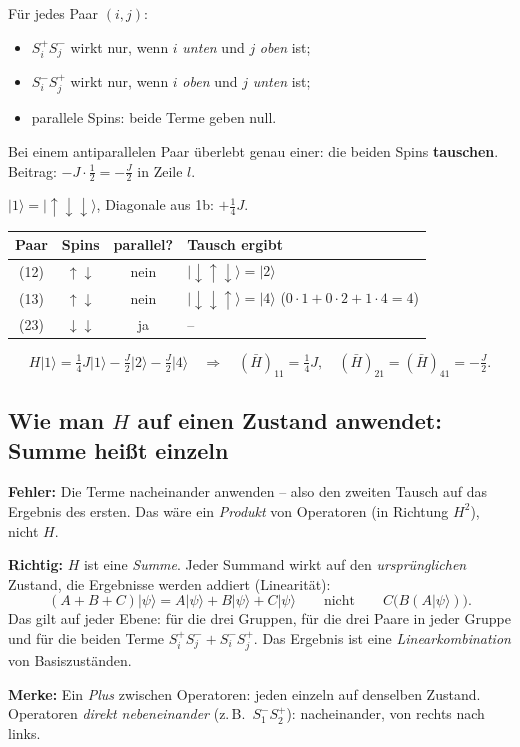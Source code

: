 \documentclass[11pt,a4paper]{article}
\newcommand{\ket}[1]{\lvert #1\rangle}
\newcommand{\up}{{\uparrow}}
\newcommand{\dn}{{\downarrow}}
\newcommand{\Hbar}{\bar H}
\begin{document}
Für jedes Paar $(i,j)$:
\begin{itemize}[itemsep=2pt]
\item $S^+_iS^-_j$ wirkt nur, wenn $i$ \emph{unten} und $j$ \emph{oben} ist;
\item $S^-_iS^+_j$ wirkt nur, wenn $i$ \emph{oben} und $j$ \emph{unten} ist;
\item parallele Spins: beide Terme geben null.
\end{itemize}
Bei einem antiparallelen Paar überlebt genau einer: die beiden Spins \textbf{tauschen}. Beitrag: $-J\cdot\tfrac12 = -\tfrac J2$ in Zeile $l$.

\begin{rechnung}
$\ket 1 = \ket{\up\dn\dn}$, Diagonale aus 1b: $+\tfrac14J$.
\begin{center}
\begin{tabular}{@{}cccl@{}}
\toprule
Paar & Spins & parallel? & Tausch ergibt\\
\midrule
(12) & $\up\dn$ & nein & $\ket{\dn\up\dn} = \ket 2$\\
(13) & $\up\dn$ & nein & $\ket{\dn\dn\up} = \ket 4$ \quad ($0\cdot1+0\cdot2+1\cdot4 = 4$)\\
(23) & $\dn\dn$ & ja & --\\
\bottomrule
\end{tabular}
\end{center}
\[
H\ket1 = \tfrac14J\ket1 - \tfrac J2\ket2 - \tfrac J2\ket4
\quad\Rightarrow\quad
(\Hbar)_{11} = \tfrac14J,\quad (\Hbar)_{21} = (\Hbar)_{41} = -\tfrac J2 .
\]
\end{rechnung}

\subsection{Wie man \texorpdfstring{$H$}{H} auf einen Zustand anwendet: Summe heißt einzeln}

\begin{falle}
\textbf{Fehler:} Die Terme nacheinander anwenden -- also den zweiten Tausch auf das Ergebnis des ersten. Das wäre ein \emph{Produkt} von Operatoren (in Richtung $H^2$), nicht $H$.

\textbf{Richtig:} $H$ ist eine \emph{Summe}. Jeder Summand wirkt auf den \emph{ursprünglichen} Zustand, die Ergebnisse werden addiert (Linearität):
\[
(A+B+C)\ket\psi = A\ket\psi + B\ket\psi + C\ket\psi \qquad\text{nicht}\qquad C\big(B(A\ket\psi)\big).
\]
Das gilt auf jeder Ebene: für die drei Gruppen, für die drei Paare in jeder Gruppe und für die beiden Terme $S^+_iS^-_j + S^-_iS^+_j$. Das Ergebnis ist eine \emph{Linearkombination} von Basiszuständen.

\textbf{Merke:} Ein \emph{Plus} zwischen Operatoren: jeden einzeln auf denselben Zustand. Operatoren \emph{direkt nebeneinander} (z.\,B.\ $S^-_1S^+_2$): nacheinander, von rechts nach links.
\end{falle}
\end{document}
